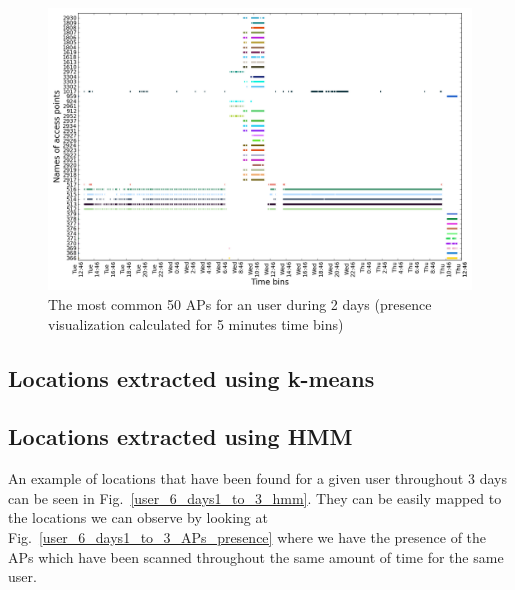 \begin{figure}[!h]
\centering
\includegraphics[width=1\textwidth]{figures/presence/user_3_sorted_2days_no_rssi_plot.png}
\caption{The most common 50 APs for an user during 2 days (presence
visualization calculated for 5 minutes time bins)}
\label{user_3_pres_2d_A}
\end{figure}

\subsection{Locations extracted using k-means}
\label{appendix_kmeans}

\subsection{Locations extracted using HMM}
\label{appendix_hmm}

An example of locations that have been found for a given user throughout $3$
days can be seen in Fig.~\ref{user_6_days1_to_3_hmm}. They can be easily mapped
to the locations we can observe by looking at
Fig.~\ref{user_6_days1_to_3_APs_presence} where we have the presence of the APs
which have been scanned throughout the same amount of time for the same user.

